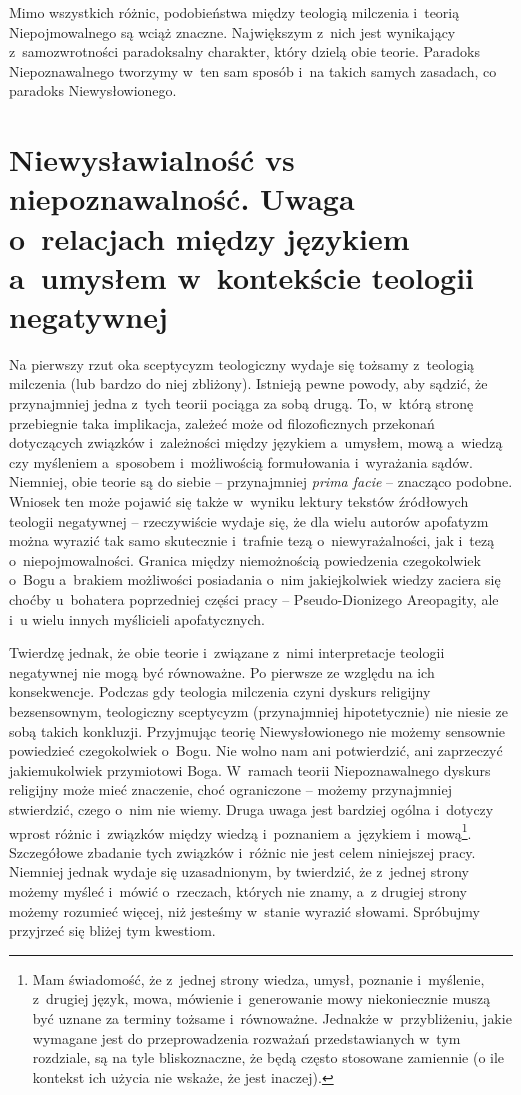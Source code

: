 Mimo wszystkich różnic, podobieństwa między teologią milczenia i~teorią Niepojmowalnego są wciąż znaczne. Największym z~nich jest wynikający z~samozwrotności paradoksalny charakter, który dzielą obie teorie. Paradoks Niepoznawalnego tworzymy w~ten sam sposób i~na takich samych zasadach, co paradoks Niewysłowionego.


\section{Niewysławialność vs niepoznawalność. Uwaga o~relacjach między językiem a~umysłem w~kontekście teologii negatywnej}\label{scep-werapo}

Na pierwszy rzut oka sceptycyzm teologiczny wydaje się tożsamy z~teologią milczenia (lub bardzo do niej zbliżony). Istnieją pewne powody, aby sądzić, że przynajmniej jedna z~tych teorii pociąga za sobą drugą. To, w~którą stronę przebiegnie taka implikacja, zależeć może od filozoficznych przekonań dotyczących związków i~zależności między językiem a~umysłem, mową a~wiedzą czy myśleniem a~sposobem i~możliwością formułowania i~wyrażania sądów. Niemniej, obie teorie są do siebie -- przynajmniej \textit{prima facie} -- znacząco podobne. Wniosek ten może pojawić się także w~wyniku lektury tekstów źródłowych teologii negatywnej -- rzeczywiście wydaje się, że dla wielu autorów apofatyzm można wyrazić tak samo skutecznie i~trafnie tezą o~niewyrażalności, jak i~tezą o~niepojmowalności. Granica między niemożnością powiedzenia czegokolwiek o~Bogu a~brakiem możliwości posiadania o~nim jakiejkolwiek wiedzy zaciera się choćby u~bohatera poprzedniej części pracy -- Pseudo-Dionizego Areopagity, ale i~u wielu innych myślicieli apofatycznych.

Twierdzę jednak, że obie teorie i~związane z~nimi interpretacje teologii negatywnej nie mogą być równoważne. Po pierwsze ze względu na ich konsekwencje. Podczas gdy teologia milczenia czyni dyskurs religijny bezsensownym, teologiczny sceptycyzm (przynajmniej hipotetycznie) nie niesie ze sobą takich konkluzji. Przyjmując teorię Niewysłowionego nie możemy sensownie powiedzieć czegokolwiek o~Bogu. Nie wolno nam ani potwierdzić, ani zaprzeczyć jakiemukolwiek przymiotowi Boga. W~ramach teorii Niepoznawalnego dyskurs religijny może mieć znaczenie, choć ograniczone -- możemy przynajmniej stwierdzić, czego o~nim nie wiemy. Druga uwaga jest bardziej ogólna i~dotyczy wprost różnic i~związków między wiedzą i~poznaniem a~językiem i~mową\footnote{Mam świadomość, że z~jednej strony wiedza, umysł, poznanie i~myślenie, z~drugiej język, mowa, mówienie i~generowanie mowy niekoniecznie muszą być uznane za terminy tożsame i~równoważne. Jednakże w~przybliżeniu, jakie wymagane jest do przeprowadzenia rozważań przedstawianych w~tym rozdziale, są na tyle bliskoznaczne, że będą często stosowane zamiennie (o ile kontekst ich użycia nie wskaże, że jest inaczej).}. Szczegółowe zbadanie tych związków i~różnic nie jest celem niniejszej pracy. Niemniej jednak wydaje się uzasadnionym, by twierdzić, że z~jednej strony możemy myśleć i~mówić o~rzeczach, których nie znamy, a~z drugiej strony możemy rozumieć więcej, niż jesteśmy w~stanie wyrazić słowami. Spróbujmy przyjrzeć się bliżej tym kwestiom.

